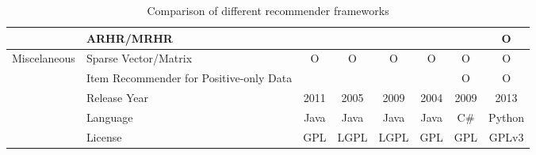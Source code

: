 \begin{table}[h]
{\begin{tabular}{c|l|cccccc}
                                         &ARHR/MRHR&&&&&&O\\ \midrule
    \multirow{6}{*}{Miscelaneous}        &Sparse Vector/Matrix&O&O&O&O&O&O\\
                                         &Item Recommender for Positive-only Data&&&&&O&O\\
                                         &Release Year&2011&2005&2009&2004&2009&2013\\
                                         &Language&Java&Java&Java&Java&C\#&Python\\
                                         &License&GPL&LGPL&LGPL&GPL&GPL&GPLv3\\ \bottomrule
\end{tabular}}
\caption{Comparison of different recommender frameworks}
\end{table}
